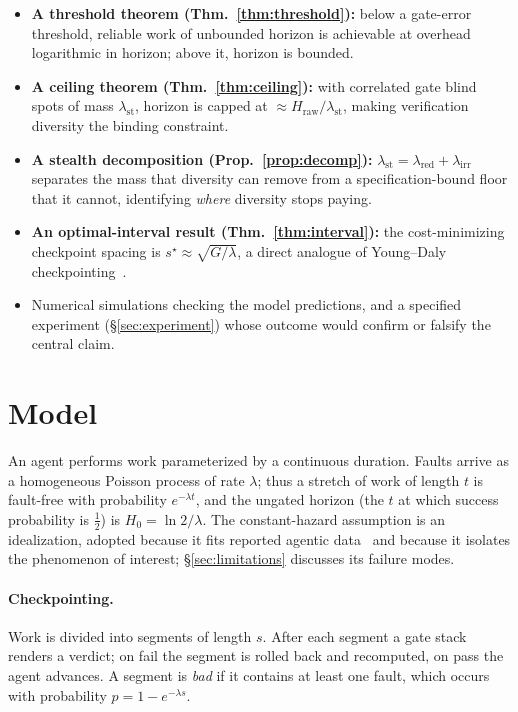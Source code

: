 \documentclass[11pt]{article}
\theoremstyle{remark}
\newcommand{\lst}{\lambda_{\mathrm{st}}}
\newcommand{\lred}{\lambda_{\mathrm{red}}}
\newcommand{\lirr}{\lambda_{\mathrm{irr}}}
\newcommand{\Hraw}{H_{\mathrm{raw}}}
\begin{document}
\begin{itemize}[leftmargin=1.4em,itemsep=2pt]
\item \textbf{A threshold theorem (Thm.~\ref{thm:threshold}):} below a gate-error threshold,
reliable work of unbounded horizon is achievable at overhead logarithmic in horizon;
above it,
horizon is bounded.
\item \textbf{A ceiling theorem (Thm.~\ref{thm:ceiling}):} with correlated gate blind spots of
mass $\lst$, horizon is capped at $\approx \Hraw/\lst$, making verification diversity the binding
constraint.
\item \textbf{A stealth decomposition (Prop.~\ref{prop:decomp}):} $\lst=\lred+\lirr$ separates the
mass that diversity can remove from a specification-bound floor that it cannot, identifying
\emph{where} diversity stops paying.
\item \textbf{An optimal-interval result (Thm.~\ref{thm:interval}):} the cost-minimizing
checkpoint spacing is $s^\star\approx\sqrt{G/\lambda}$, a direct analogue of Young--Daly
checkpointing~\cite{young1974,daly2006}.
\item Numerical simulations checking the model predictions, and a specified experiment (\S\ref{sec:experiment})
whose outcome would confirm or falsify the central claim.
\end{itemize}

\section{Model}
An agent performs work parameterized by a continuous duration. Faults arrive as a homogeneous
Poisson process of rate $\lambda$;
thus a stretch of work of length $t$ is fault-free with
probability $e^{-\lambda t}$, and the ungated horizon (the $t$ at which success probability is
$\tfrac12$) is $H_0=\ln 2/\lambda$.
The constant-hazard assumption is an idealization, adopted
because it fits reported agentic data~\cite{ord2025} and because it isolates the phenomenon of
interest;
\S\ref{sec:limitations} discusses its failure modes.

\paragraph{Checkpointing.} Work is divided into segments of length $s$.
After each segment a gate
stack renders a verdict; on fail the segment is rolled back and recomputed, on pass the agent
advances.
A segment is \emph{bad} if it contains at least one fault, which occurs with probability
$p=1-e^{-\lambda s}$.
\end{document}
